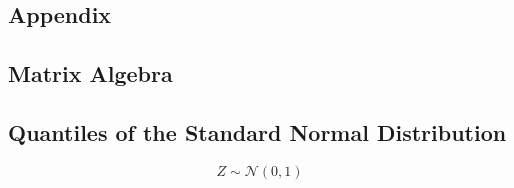 \begin{multicols*}{3}
    \section{Appendix}
    
    \subsection{Matrix Algebra}
    
    
\end{multicols*}

\newpage{}

\begin{multicols*}{2}
    
    \subsection{Quantiles of the Standard Normal Distribution}
    \noindent\begin{equation*}
        Z\sim\mathcal{N}(0,1)
    \end{equation*}
    
    \setlength{\oldtabcolsep}{\tabcolsep}\setlength\tabcolsep{5pt}
    

\end{multicols*}
